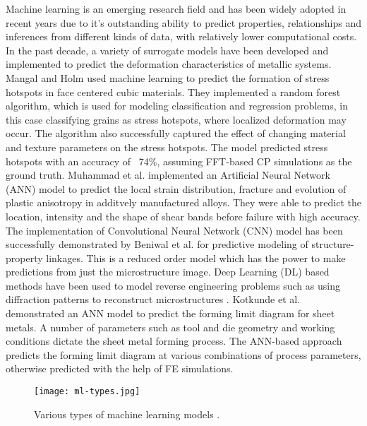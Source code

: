 Machine learning is an emerging research field and has been widely adopted in recent years due to it's outstanding ability to predict properties, relationships and inferences from different kinds of data, with relatively lower computational costs. In the past decade, a variety of surrogate models have been developed and implemented to predict the deformation characteristics of metallic systems. Mangal and Holm \cite{MANGAL2018122} used machine learning to predict the formation of stress hotspots in face centered cubic materials. They implemented a random forest algorithm, which is used for modeling classification and regression problems, in this case classifying grains as stress hotspots, where localized deformation may occur. The algorithm also successfully captured the effect of changing material and texture parameters on the stress hotspots. The model predicted stress hotspots with an accuracy of ~74\%, assuming FFT-based CP simulations as the ground truth. Muhammad et al. \cite{muhammad2020machine} implemented an Artificial Neural Network (ANN) model to predict the local strain distribution, fracture and evolution of plastic anisotropy in additvely manufactured alloys. They were able to predict the location, intensity and the shape of shear bands before failure with high accuracy. The implementation of Convolutional Neural Network (CNN) model has been successfully demonstrated by Beniwal et al. \cite{beniwal2019deep} for predictive modeling of structure-property linkages. This is a reduced order model which has the power to make predictions from just the microstructure image. Deep Learning (DL) based methods have been used to model reverse engineering problems such as using diffraction patterns to reconstruct microstructures \cite{shen2019convolutional}. Kotkunde et al. \cite{kotkunde2014prediction} demonstrated an ANN model to predict the forming limit diagram for sheet metals. A number of parameters such as tool and die geometry and working conditions dictate the sheet metal forming process. The ANN-based approach predicts the forming limit diagram at various combinations of process parameters, otherwise predicted with the help of FE simulations. 

\begin{figure}[!h]
	\centering
	\texttt{[image: ml-types.jpg]}
	\hspace{1mm}
	\caption{Various types of machine learning models \cite{muhammad2020machine}.} 
	\label{fig:ml-types}
\end{figure}

